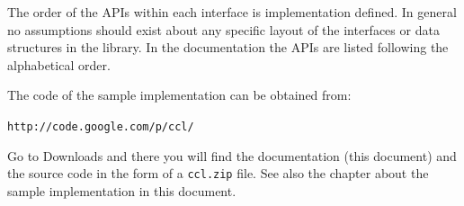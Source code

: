 The order of the APIs within each interface is implementation defined. In general no assumptions should 
exist about any specific layout of the interfaces or data structures in the library. In the documentation
the APIs are listed following the alphabetical order.

The code of the sample implementation can be obtained from:

\noindent\verb,http://code.google.com/p/ccl/,

Go to Downloads and there you will find the documentation (this document) and the source code in the form of a \verb,ccl.zip, file.
 See also the chapter about the sample implementation in this document.


